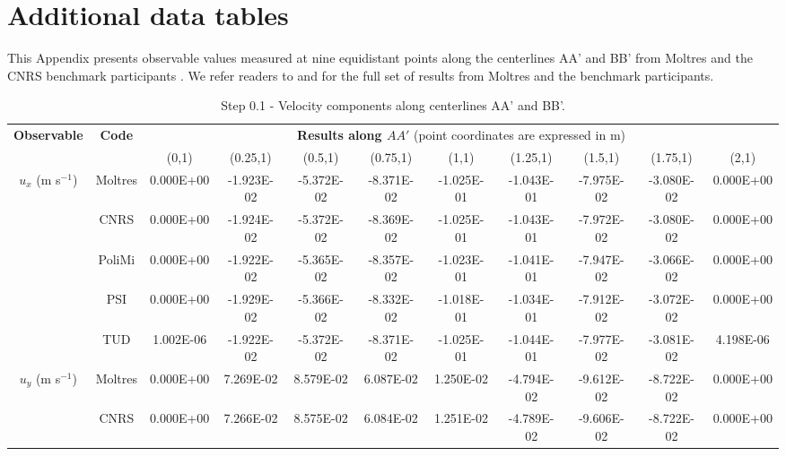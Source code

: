 \appendix
\section{Additional data tables} \label{appendix:tables}

This Appendix presents observable values measured at nine
equidistant points along the centerlines AA' and BB' from Moltres and the
CNRS benchmark participants \cite{tiberga_results_2020}. We refer readers to
\cite{park_results_2021} and \cite{tiberga_results_2019} for the full set of
results from Moltres and the benchmark participants. 

\begin{table}[htbp!]
	\caption{Step 0.1 - Velocity components along centerlines AA' and BB'.}
	\centering
	\footnotesize
	\setlength\tabcolsep{1.5pt}
	\hspace*{-2cm}
	\renewcommand{\arraystretch}{.8}
	\begin{tabular}{c c c c c c c c c c c}
		\toprule
		\multirow{2}{*}{\textbf{Observable}} & \multirow{2}{*}{\textbf{Code}} & \multicolumn{9}{c}{\textbf{Results along $AA'$} (point coordinates are expressed in m)} \\
		& & {(0,1)} & {(0.25,1)} & {(0.5,1)} & {(0.75,1)} & {(1,1)} & {(1.25,1)} & {(1.5,1)} & {(1.75,1)} & {(2,1)} \\
		\midrule
		\multirow{5}{*}{$u_x$ (m s$^{-1}$)} & Moltres & 0.000E+00 & -1.923E-02 & -5.372E-02 & -8.371E-02 & -1.025E-01 & -1.043E-01 & -7.975E-02 & -3.080E-02 & 0.000E+00 \\
		& CNRS & 0.000E+00 & -1.924E-02 & -5.372E-02 & -8.369E-02 & -1.025E-01 & -1.043E-01 & -7.972E-02 & -3.080E-02 & 0.000E+00 \\
        & PoliMi & 0.000E+00 & -1.922E-02 & -5.365E-02 & -8.357E-02 & -1.023E-01 & -1.041E-01 & -7.947E-02 & -3.066E-02 & 0.000E+00 \\
        & PSI & 0.000E+00 & -1.929E-02 & -5.366E-02 & -8.332E-02 & -1.018E-01 & -1.034E-01 & -7.912E-02 & -3.072E-02 & 0.000E+00 \\
        & TUD & 1.002E-06 & -1.922E-02 & -5.372E-02 & -8.371E-02 & -1.025E-01 & -1.044E-01 & -7.977E-02 & -3.081E-02 & 4.198E-06 \\
        \midrule
		\multirow{5}{*}{$u_y$ (m s$^{-1}$)} & Moltres & 0.000E+00 & 7.269E-02 & 8.579E-02 & 6.087E-02 & 1.250E-02 & -4.794E-02 & -9.612E-02 & -8.722E-02 & 0.000E+00\\
		& CNRS & 0.000E+00 & 7.266E-02 & 8.575E-02 & 6.084E-02 & 1.251E-02 & -4.789E-02 & -9.606E-02 & -8.722E-02 & 0.000E+00 \\

\end{tabular}
\end{table}
